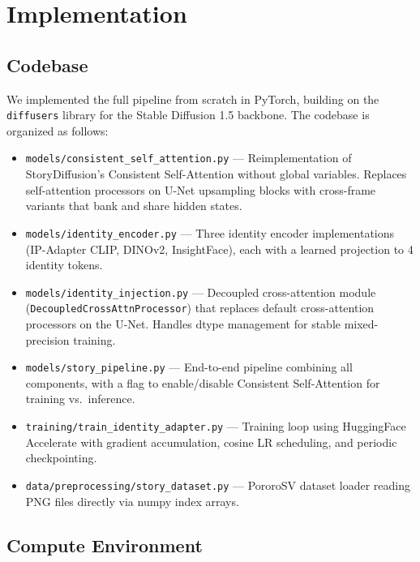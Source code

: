 \documentclass[11pt]{article}
\begin{document}
\section{Implementation}

\subsection{Codebase}

We implemented the full pipeline from scratch in PyTorch, building on the \texttt{diffusers} library for the Stable Diffusion 1.5 backbone. The codebase is organized as follows:

\begin{itemize}[leftmargin=*]
    \item \texttt{models/consistent\_self\_attention.py} --- Reimplementation of StoryDiffusion's Consistent Self-Attention without global variables. Replaces self-attention processors on U-Net upsampling blocks with cross-frame variants that bank and share hidden states.
    \item \texttt{models/identity\_encoder.py} --- Three identity encoder implementations (IP-Adapter CLIP, DINOv2, InsightFace), each with a learned projection to 4 identity tokens.
    \item \texttt{models/identity\_injection.py} --- Decoupled cross-attention module (\texttt{DecoupledCrossAttnProcessor}) that replaces default cross-attention processors on the U-Net. Handles dtype management for stable mixed-precision training.
    \item \texttt{models/story\_pipeline.py} --- End-to-end pipeline combining all components, with a flag to enable/disable Consistent Self-Attention for training vs.\ inference.
    \item \texttt{training/train\_identity\_adapter.py} --- Training loop using HuggingFace Accelerate with gradient accumulation, cosine LR scheduling, and periodic checkpointing.
    \item \texttt{data/preprocessing/story\_dataset.py} --- PororoSV dataset loader reading PNG files directly via numpy index arrays.
\end{itemize}

\subsection{Compute Environment}
\end{document}
